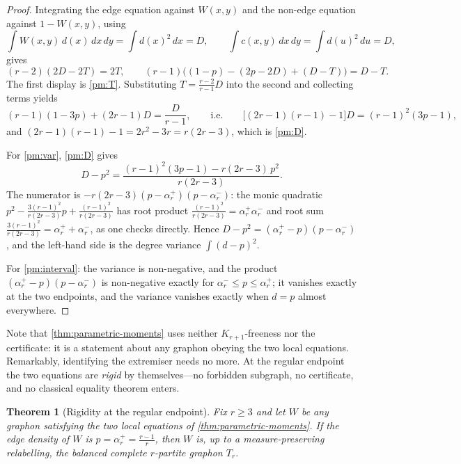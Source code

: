 \documentclass[11pt]{article}
\newtheorem{theorem}{Theorem}
\theoremstyle{definition}
\begin{document}
\begin{proof}
Integrating the edge equation against $W(x,y)$ and the non-edge equation against
$1-W(x,y)$, using
\[
  \int W(x,y)\,d(x)\,dx\,dy=\int d(x)^2\,dx=D,
  \qquad
  \int c(x,y)\,dx\,dy=\int d(u)^2\,du=D,
\]
gives
\[
  (r-2)(2D-2T)=2T,
  \qquad
  (r-1)\bigl((1-p)-(2p-2D)+(D-T)\bigr)=D-T .
\]
The first display is \ref{pm:T}.  Substituting $T=\frac{r-2}{r-1}D$ into the second and
collecting terms yields
\[
  (r-1)(1-3p)+(2r-1)D=\frac{D}{r-1},
  \qquad\text{i.e.}\qquad
  \bigl[(2r-1)(r-1)-1\bigr]D=(r-1)^2(3p-1),
\]
and $(2r-1)(r-1)-1=2r^2-3r=r(2r-3)$, which is \ref{pm:D}.

For \ref{pm:var}, \ref{pm:D} gives
\[
  D-p^2
  =
  \frac{(r-1)^2(3p-1)-r(2r-3)\,p^2}{r(2r-3)} .
\]
The numerator is $-r(2r-3)(p-\alpha_r^+)(p-\alpha_r^-)$: the monic quadratic
$p^2-\frac{3(r-1)^2}{r(2r-3)}p+\frac{(r-1)^2}{r(2r-3)}$ has root product
$\frac{(r-1)^2}{r(2r-3)}=\alpha_r^+\alpha_r^-$ and root sum
$\frac{3(r-1)^2}{r(2r-3)}=\alpha_r^++\alpha_r^-$, as one checks directly.  Hence
$D-p^2=(\alpha_r^+-p)(p-\alpha_r^-)$, and the left-hand side is the degree variance
$\int(d-p)^2$.

For \ref{pm:interval}: the variance is non-negative, and the product
$(\alpha_r^+-p)(p-\alpha_r^-)$ is non-negative exactly for
$\alpha_r^-\le p\le\alpha_r^+$; it vanishes exactly at the two endpoints, and the
variance vanishes exactly when $d=p$ almost everywhere.
\end{proof}

Note that \cref{thm:parametric-moments} uses neither $K_{r+1}$-freeness nor the
certificate: it is a statement about any graphon obeying the two local equations.
Remarkably, identifying the extremiser needs no more.  At the regular endpoint the two
equations are \emph{rigid} by themselves---no forbidden subgraph, no certificate, and no
classical equality theorem enters.

\begin{theorem}[Rigidity at the regular endpoint]\label{thm:slice-rigidity}
Fix $r\ge3$ and let $W$ be any graphon satisfying the two local equations of
\cref{thm:parametric-moments}.  If the edge density of $W$ is
$p=\alpha_r^+=\frac{r-1}r$, then $W$ is, up to a measure-preserving relabelling, the
balanced complete $r$-partite graphon $T_r$.
\end{theorem}
\end{document}
